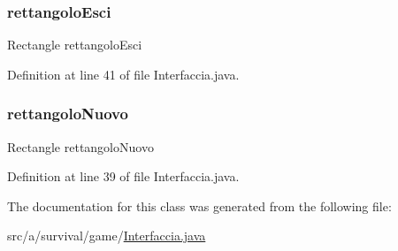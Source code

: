\subsubsection{\texorpdfstring{rettangolo\+Esci}{rettangoloEsci}}
{\footnotesize\ttfamily Rectangle rettangolo\+Esci\hspace{0.3cm}{\ttfamily [private]}}



Definition at line 41 of file Interfaccia.\+java.

\mbox{\label{classa_1_1survival_1_1game_1_1_interfaccia_abe31ab860ef846d30a5e7b91253e3ff5}} 
\subsubsection{\texorpdfstring{rettangolo\+Nuovo}{rettangoloNuovo}}
{\footnotesize\ttfamily Rectangle rettangolo\+Nuovo\hspace{0.3cm}{\ttfamily [private]}}



Definition at line 39 of file Interfaccia.\+java.



The documentation for this class was generated from the following file\+:\begin{DoxyCompactItemize}
\item 
src/a/survival/game/\hyperlink{_interfaccia_8java}{Interfaccia.\+java}\end{DoxyCompactItemize}
